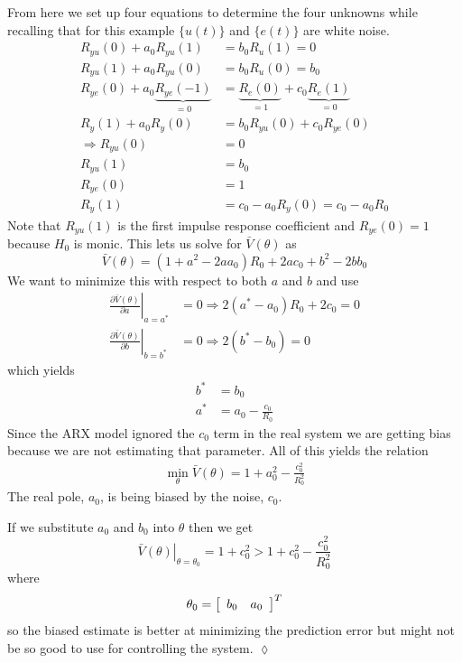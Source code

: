 \begin{example}
From here we set up four equations to determine the four unknowns while recalling that for this example $\{u(t)\}$ and $\{e(t)\}$ are white noise.
\begin{align*}
R_{yu}(0) + a_0R_{yu}(1) &= b_0R_u(1) = 0 \\
R_{yu}(1) + a_0R_{yu}(0) &= b_0R_u(0) = b_0 \\
R_{ye}(0) + a_0\underbrace{R_{ye}(-1)}_{=0} &= \underbrace{R_e(0)}_{=1} + c_0\underbrace{R_e(1)}_{=0} \\
R_y(1) + a_0R_y(0) &= b_0R_{yu}(0) + c_0R_{ye}(0) \\
\Rightarrow R_{yu}(0) &= 0 \\
R_{yu}(1) &= b_0 \\
R_{ye}(0) &= 1 \\
R_y(1) &= c_0-a_0R_y(0) = c_0-a_0R_0
\end{align*}
Note that $R_{yu}(1)$ is the first impulse response coefficient and $R_{ye}(0)=1$ because $H_0$ is monic. This lets us solve for $\bar{V}(\theta)$ as
$$\bar{V}(\theta) = (1+a^2-2aa_0)R_0+2ac_0 + b^2 - 2bb_0$$
We want to minimize this with respect to both $a$ and $b$ and use
\begin{align*}
\left.\frac{\partial\bar{V}(\theta)}{\partial a}\right|_{a=a^\ast} &= 0 \Rightarrow 2(a^\ast-a_0)R_0+2c_0=0 \\
\left.\frac{\partial\bar{V}(\theta)}{\partial b}\right|_{b=b^\ast} &= 0 \Rightarrow 2(b^\ast-b_0)=0
\end{align*}
which yields
\begin{align*}
b^\ast &= b_0 \\
a^\ast &= a_0-\frac{c_0}{R_0}
\end{align*}
Since the ARX model ignored the $c_0$ term in the real system we are getting bias because we are not estimating that parameter. All of this yields the relation
\begin{align*}
\boxed{\min_\theta\bar{V}(\theta) = 1+a_0^2-\frac{c_0^2}{R_0^2}}
\end{align*}
The real pole, $a_0$, is being biased by the noise, $c_0$.

If we substitute $a_0$ and $b_0$ into $\theta$ then we get
$$\left.\bar{V}(\theta)\right|_{\theta=\theta_0} = 1+c_0^2 > 1+c_0^2-\frac{c_0^2}{R_0^2}$$
where
$$\theta_0 = \left[\begin{array}{c c} b_0 & a_0 \end{array}\right]^T$$
so the biased estimate is better at minimizing the prediction error but might not be so good to use for controlling the system.
$\lozenge$
\end{example}

